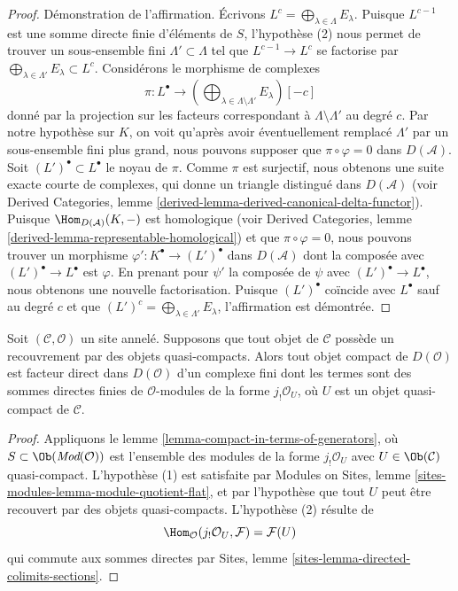\begin{proof}
\medskip\noindent
Démonstration de l'affirmation. Écrivons
$L^c = \bigoplus_{\lambda \in \Lambda} E_\lambda$. Puisque $L^{c - 1}$ est
une somme directe finie d'éléments de $S$, l'hypothèse (2) nous permet de
trouver un sous-ensemble fini $\Lambda' \subset \Lambda$ tel que
$L^{c - 1} \to L^c$ se factorise par
$\bigoplus_{\lambda \in \Lambda'} E_\lambda \subset L^c$. Considérons le
morphisme de complexes
$$
\pi :
L^\bullet
\longrightarrow
(\bigoplus\nolimits_{\lambda \in \Lambda \setminus \Lambda'} E_\lambda)[-c]
$$
donné par la projection sur les facteurs correspondant à
$\Lambda \setminus \Lambda'$ au degré $c$. Par notre hypothèse sur $K$, on
voit qu'après avoir éventuellement remplacé $\Lambda'$ par un sous-ensemble
fini plus grand, nous pouvons supposer que $\pi \circ \varphi = 0$ dans
$D(\mathcal{A})$. Soit $(L')^\bullet \subset L^\bullet$ le noyau de $\pi$.
Comme $\pi$ est surjectif, nous obtenons une suite exacte courte de complexes,
qui donne un triangle distingué dans $D(\mathcal{A})$ (voir Derived
Categories, lemme \ref{derived-lemma-derived-canonical-delta-functor}).
Puisque $\Hom_{D(\mathcal{A})}(K, -)$ est homologique (voir Derived
Categories, lemme \ref{derived-lemma-representable-homological}) et que
$\pi \circ \varphi = 0$, nous pouvons trouver un morphisme
$\varphi' : K^\bullet \to (L')^\bullet$ dans $D(\mathcal{A})$ dont la
composée avec $(L')^\bullet \to L^\bullet$ est $\varphi$. En prenant pour
$\psi'$ la composée de $\psi$ avec $(L')^\bullet \to L^\bullet$, nous
obtenons une nouvelle factorisation. Puisque $(L')^\bullet$ coïncide avec
$L^\bullet$ sauf au degré $c$ et que
$(L')^c = \bigoplus_{\lambda \in \Lambda'} E_\lambda$, l'affirmation est
démontrée.
\end{proof}

\begin{lemma}
\label{lemma-compact-objects-if-enough-qc}
Soit $(\mathcal{C}, \mathcal{O})$ un site annelé. Supposons que tout objet de
$\mathcal{C}$ possède un recouvrement par des objets quasi-compacts. Alors
tout objet compact de $D(\mathcal{O})$ est facteur direct dans
$D(\mathcal{O})$ d'un complexe fini dont les termes sont des sommes directes
finies de $\mathcal{O}$-modules de la forme $j_!\mathcal{O}_U$, où $U$ est un
objet quasi-compact de $\mathcal{C}$.
\end{lemma}

\begin{proof}
Appliquons le lemme \ref{lemma-compact-in-terms-of-generators}, où
$S \subset \Ob(\textit{Mod}(\mathcal{O}))$ est l'ensemble des modules de la
forme $j_!\mathcal{O}_U$ avec $U \in \Ob(\mathcal{C})$ quasi-compact.
L'hypothèse (1) est satisfaite par Modules on Sites, lemme
\ref{sites-modules-lemma-module-quotient-flat}, et par l'hypothèse que tout
$U$ peut être recouvert par des objets quasi-compacts. L'hypothèse (2) résulte
de
$$
\Hom_\mathcal{O}(j_!\mathcal{O}_U, \mathcal{F}) = \mathcal{F}(U)
$$
qui commute aux sommes directes par Sites, lemme
\ref{sites-lemma-directed-colimits-sections}.
\end{proof}

